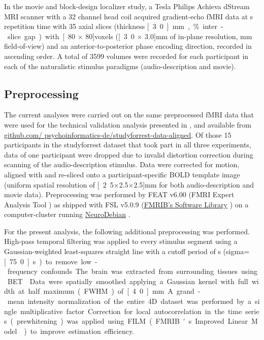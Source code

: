 \documentclass[english,11pt]{article}
\begin{document}
In the movie and block-design localizer study, a \unit[3]{Tesla} Philips Achieva dStream
MRI scanner with a 32 channel head coil acquired gradient-echo fMRI data
at \unit[2]{s} repetition time with
35 axial slices (thickness \unit[3.0]{mm}, \unit[10]{\%} inter-slice gap) with
\unit[80 $\times$ 80]{voxels} (\unit[3.0 $\times$ 3.0]{mm} of in-plane
resolution, \unit[240]{mm} field-of-view) and an anterior-to-posterior phase
encoding direction, recorded in ascending order.
A total of 3599 volumes were recorded for each participant in each of the
naturalistic stimulus paradigms (audio-description and movie).

\subsection*{Preprocessing}

The current analyses were carried out on the same preprocessed fMRI data that were used
for the technical validation analysis presented in \citet{hanke2016simultaneous}, and available from \href{https://github.com/psychoinformatics-de/studyforrest-data-aligned}{github.com/ psychoinformatics-de/studyforrest-data-aligned}.
Of those 15 participants in the studyforrest dataset that took
part in all three experiments,
data of one participant were dropped due to invalid distortion correction
during scanning of the audio-description stimulus.
Data were corrected for motion, aligned with and re-sliced onto a
participant-specific BOLD template image \citep{sengupta2016extension}
(uniform spatial resolution of \unit[2.5$\times$2.5$\times$2.5]{mm} for both
audio-description and movie data).
Preprocessing was performed by FEAT v6.00 (FMRI Expert Analysis Tool \citep{woolrich2001autocorr}) as shipped with
FSL v5.0.9 (\href{https://www.fmrib.ox.ac.uk/fsl}{FMRIB's Software Library}
 \citep{smith2004fsl}) on a computer-cluster running
\href{http://neuro.debian.net}{NeuroDebian} \citep{halchenko2012open}.

For the present analysis, the following additional preprocessing was performed.
High-pass temporal filtering was applied to every stimulus segment using a
Gaussian-weighted least-squares straight line with a cutoff period of
\unit[150]{s} (sigma=\unit[75.0]{s}) to remove low-frequency confounds.
The brain was extracted from surrounding tissues using BET \citep{smith2002bet}.
Data were spatially smoothed applying a Gaussian kernel with full width at half
maximum (FWHM) of \unit[4.0]{mm}.
A grand-mean intensity normalization of the entire 4D dataset was performed by a
single multiplicative factor.
Correction for local autocorrelation in the time series (prewhitening) was
applied using FILM (FMRIB's Improved Linear Model \citep{woolrich2001autocorr})
to improve estimation efficiency.
\end{document}
